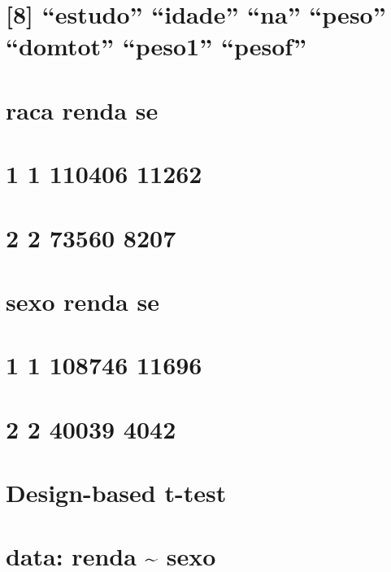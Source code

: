 \documentclass[]{book}
\theoremstyle{definition}
\theoremstyle{definition}
\theoremstyle{definition}
\theoremstyle{remark}
\begin{document}
\section{\texorpdfstring{{[}8{]} ``estudo'' ``idade'' ``na'' ``peso''
``domtot'' ``peso1''
``pesof''}{{[}8{]} estudo idade na peso domtot peso1 pesof}}\label{estudo-idade-na-peso-domtot-peso1-pesof}

\section{raca renda se}\label{raca-renda-se}

\section{1 1 110406 11262}\label{section-20}

\section{2 2 73560 8207}\label{section-21}

\section{sexo renda se}\label{sexo-renda-se}

\section{1 1 108746 11696}\label{section-22}

\section{2 2 40039 4042}\label{section-23}

\section{}\label{section-24}

\section{Design-based t-test}\label{design-based-t-test}

\section{}\label{section-25}

\section{data: renda \textasciitilde{} sexo}\label{data-renda-sexo}
\end{document}
